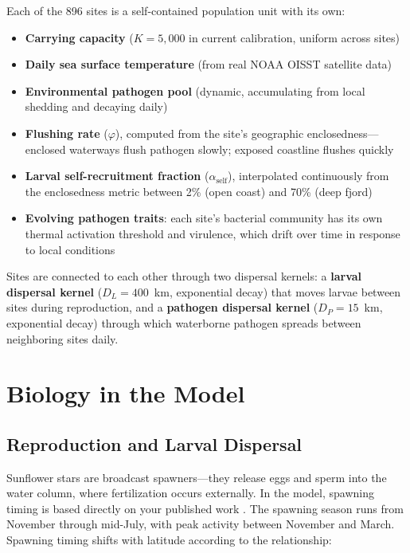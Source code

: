 \documentclass[11pt]{article}
\begin{document}
Each of the 896 sites is a self-contained population unit with its own:
\begin{itemize}[leftmargin=2em]
    \item \textbf{Carrying capacity} ($K = 5{,}000$ in current calibration, uniform across sites)
    \item \textbf{Daily sea surface temperature} (from real NOAA OISST satellite data)
    \item \textbf{Environmental pathogen pool} (dynamic, accumulating from local shedding and decaying daily)
    \item \textbf{Flushing rate} ($\varphi$), computed from the site's geographic enclosedness---enclosed waterways flush pathogen slowly; exposed coastline flushes quickly
    \item \textbf{Larval self-recruitment fraction} ($\alpha_{\text{self}}$), interpolated continuously from the enclosedness metric between 2\% (open coast) and 70\% (deep fjord)
    \item \textbf{Evolving pathogen traits}: each site's bacterial community has its own thermal activation threshold and virulence, which drift over time in response to local conditions
\end{itemize}

Sites are connected to each other through two dispersal kernels: a \textbf{larval dispersal kernel} ($D_L = 400$~km, exponential decay) that moves larvae between sites during reproduction, and a \textbf{pathogen dispersal kernel} ($D_P = 15$~km, exponential decay) through which waterborne pathogen spreads between neighboring sites daily.

\section{Biology in the Model}

\subsection{Reproduction and Larval Dispersal}

Sunflower stars are broadcast spawners---they release eggs and sperm into the water column, where fertilization occurs externally. In the model, spawning timing is based directly on your published work \citep{hodin2021}. The spawning season runs from November through mid-July, with peak activity between November and March. Spawning timing shifts with latitude according to the relationship:
\end{document}
